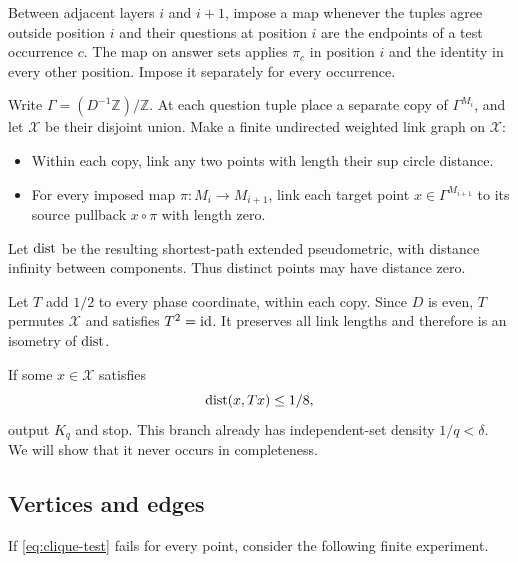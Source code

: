 Between adjacent layers $i$ and $i+1$, impose a map whenever the
tuples agree outside position $i$ and their questions at position $i$
are the endpoints of a test occurrence $c$.
The map on answer sets applies $\pi_c$ in position $i$ and the identity
in every other position. Impose it separately for every occurrence.

Write $\Gamma=(D^{-1}\mathbb Z)/\mathbb Z$.
At each question tuple place a separate copy of $\Gamma^{M_i}$,
and let $\mathscr X$ be their disjoint union.
Make a finite undirected weighted link graph on $\mathscr X$:
\begin{itemize}
\item Within each copy, link any two points with length their sup circle
distance.
\item For every imposed map $\pi:M_i\to M_{i+1}$, link each target
point $x\in\Gamma^{M_{i+1}}$ to its source pullback $x\circ\pi$
with length zero.
\end{itemize}
Let $\operatorname{dist}$ be the resulting shortest-path extended pseudometric,
with distance infinity between components.
Thus distinct points may have distance zero.

Let $T$ add $1/2$ to every phase coordinate, within each copy.
Since $D$ is even, $T$ permutes $\mathscr X$ and satisfies $T^2=\operatorname{id}$.
It preserves all link lengths and therefore is an isometry of $\operatorname{dist}$.

If some $x\in\mathscr X$ satisfies
\begin{equation}\label{eq:clique-test}
 \operatorname{dist}(x,Tx)\le1/8,
\end{equation}
output $K_q$ and stop. This branch already has independent-set density
$1/q<\delta$. We will show that it never occurs in completeness.

\subsection{Vertices and edges}

If \eqref{eq:clique-test} fails for every point, consider the following
finite experiment.

